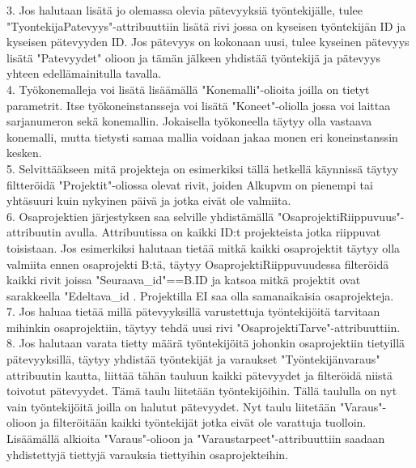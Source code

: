\documentclass{article}
\begin{document}
3. Jos halutaan lisätä jo olemassa olevia pätevyyksiä työntekijälle, tulee "TyontekijaPatevyys"-attribuuttiin lisätä rivi jossa on kyseisen työntekijän ID ja kyseisen pätevyyden ID. Jos pätevyys on kokonaan uusi, tulee kyseinen pätevyys lisätä "Patevyydet" olioon ja tämän jälkeen yhdistää työntekijä ja pätevyys yhteen edellämainitulla tavalla.
\\


4. Työkonemalleja voi lisätä lisäämällä "Konemalli"-olioita joilla on tietyt parametrit. Itse työkoneinstansseja voi lisätä "Koneet"-oliolla jossa voi laittaa sarjanumeron sekä konemallin. Jokaisella työkoneella täytyy olla vastaava konemalli, mutta tietysti samaa mallia voidaan jakaa monen eri koneinstanssin kesken.
\\

5. Selvittääkseen mitä projekteja on esimerkiksi tällä hetkellä käynnissä  täytyy filtteröidä "Projektit"-oliossa olevat rivit, joiden Alkupvm on pienempi tai yhtäsuuri kuin nykyinen päivä ja jotka eivät ole valmiita. 
\\

6. Osaprojektien järjestyksen saa selville yhdistämällä "OsaprojektiRiippuvuus"-attribuutin avulla. Attribuutissa on kaikki ID:t projekteista jotka riippuvat toisistaan. Jos esimerkiksi halutaan tietää mitkä kaikki osaprojektit täytyy olla valmiita ennen osaprojekti B:tä, täytyy OsaprojektiRiippuvuudessa filteröidä kaikki rivit joissa "Seuraava\_id"==B.ID ja katsoa mitkä projektit ovat sarakkeella "Edeltava\_id . Projektilla EI saa olla samanaikaisia osaprojekteja.
\\

7. Jos haluaa tietää millä pätevyyksillä varustettuja työntekijöitä tarvitaan mihinkin osaprojektiin, täytyy tehdä uusi rivi "OsaprojektiTarve"-attribuuttiin. 
\\

8. Jos halutaan varata tietty määrä työntekijöitä johonkin osaprojektiin tietyillä pätevyyksillä, täytyy yhdistää työntekijät ja varaukset "Työntekijänvaraus" attribuutin kautta, liittää tähän tauluun kaikki pätevyydet ja filteröidä niistä toivotut pätevyydet. Tämä taulu liitetään työntekijöihin. Tällä taululla on nyt vain työntekijöitä joilla on halutut pätevyydet. Nyt taulu liitetään "Varaus"-olioon ja filteröitään kaikki työntekijät jotka eivät ole varattuja tuolloin. Lisäämällä alkioita "Varaus"-olioon ja  "Varaustarpeet"-attribuuttiin saadaan yhdistettyjä tiettyjä varauksia tiettyihin osaprojekteihin. 
\\



\end{document}
